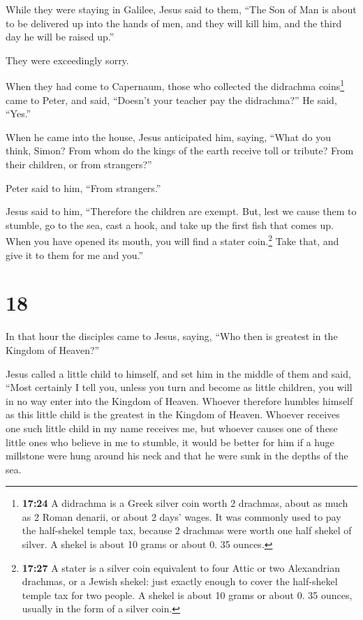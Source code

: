 While they were staying in Galilee, Jesus said to them,
``The Son of Man is about to be delivered up into the hands of men,
 and they will kill him, and the third day he will be
raised up.''

They were exceedingly sorry.

 When they had come to Capernaum, those who collected the
didrachma coins\footnote{\textbf{17:24} A didrachma is a Greek silver
  coin worth 2 drachmas, about as much as 2 Roman denarii, or about 2
  days' wages. It was commonly used to pay the half-shekel temple tax,
  because 2 drachmas were worth one half shekel of silver. A shekel is
  about 10 grams or about 0. 35 ounces.} came to Peter, and said,
``Doesn't your teacher pay the didrachma?''  He said,
``Yes.''

When he came into the house, Jesus anticipated him, saying, ``What do
you think, Simon? From whom do the kings of the earth receive toll or
tribute? From their children, or from strangers?''

 Peter said to him, ``From strangers.''

Jesus said to him, ``Therefore the children are exempt. 
But, lest we cause them to stumble, go to the sea, cast a hook, and take
up the first fish that comes up. When you have opened its mouth, you
will find a stater coin.\footnote{\textbf{17:27} A stater is a silver
  coin equivalent to four Attic or two Alexandrian drachmas, or a Jewish
  shekel: just exactly enough to cover the half-shekel temple tax for
  two people. A shekel is about 10 grams or about 0. 35 ounces, usually
  in the form of a silver coin.} Take that, and give it to them for me
and you.''

\hypertarget{section-17}{%
\section{18}\label{section-17}}

 In that hour the disciples came to Jesus, saying, ``Who
then is greatest in the Kingdom of Heaven?''

 Jesus called a little child to himself, and set him in
the middle of them  and said, ``Most certainly I tell you,
unless you turn and become as little children, you will in no way enter
into the Kingdom of Heaven.  Whoever therefore humbles
himself as this little child is the greatest in the Kingdom of Heaven.
 Whoever receives one such little child in my name
receives me,  but whoever causes one of these little ones
who believe in me to stumble, it would be better for him if a huge
millstone were hung around his neck and that he were sunk in the depths
of the sea.

